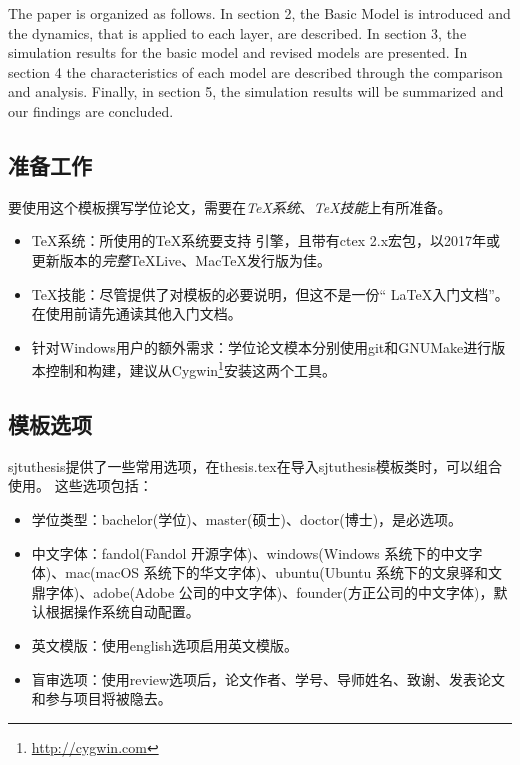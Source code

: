 The paper is organized as follows. In section 2, the Basic Model is introduced and the dynamics, that is applied to each layer, are described.  In section 3, the simulation results for the basic model and revised models are presented. In section 4 the characteristics of each model are described through the comparison and analysis. Finally, in section 5, the simulation results will be summarized and our findings are concluded.


\subsection{准备工作}
\label{sec:requirements}

要使用这个模板撰写学位论文，需要在\emph{TeX系统}、\emph{TeX技能}上有所准备。

\begin{itemize}[noitemsep,topsep=0pt,parsep=0pt,partopsep=0pt]
	\item {\TeX}系统：所使用的{\TeX}系统要支持 \XeTeX 引擎，且带有ctex 2.x宏包，以2017年或更新版本的\emph{完整}TeXLive、MacTeX发行版为佳。
	\item TeX技能：尽管提供了对模板的必要说明，但这不是一份“ \LaTeX 入门文档”。在使用前请先通读其他入门文档。
	\item 针对Windows用户的额外需求：学位论文模本分别使用git和GNUMake进行版本控制和构建，建议从Cygwin\footnote{\url{http://cygwin.com}}安装这两个工具。
\end{itemize}

\subsection{模板选项}
\label{sec:thesisoption}

sjtuthesis提供了一些常用选项，在thesis.tex在导入sjtuthesis模板类时，可以组合使用。
这些选项包括：

\begin{itemize}[noitemsep,topsep=0pt,parsep=0pt,partopsep=0pt]
	\item 学位类型：bachelor(学位)、master(硕士)、doctor(博士)，是必选项。
	\item 中文字体：fandol(Fandol 开源字体)、windows(Windows 系统下的中文字体)、mac(macOS 系统下的华文字体)、ubuntu(Ubuntu 系统下的文泉驿和文鼎字体)、adobe(Adobe 公司的中文字体)、founder(方正公司的中文字体)，默认根据操作系统自动配置。
	\item 英文模版：使用english选项启用英文模版。
	\item 盲审选项：使用review选项后，论文作者、学号、导师姓名、致谢、发表论文和参与项目将被隐去。
\end{itemize}

